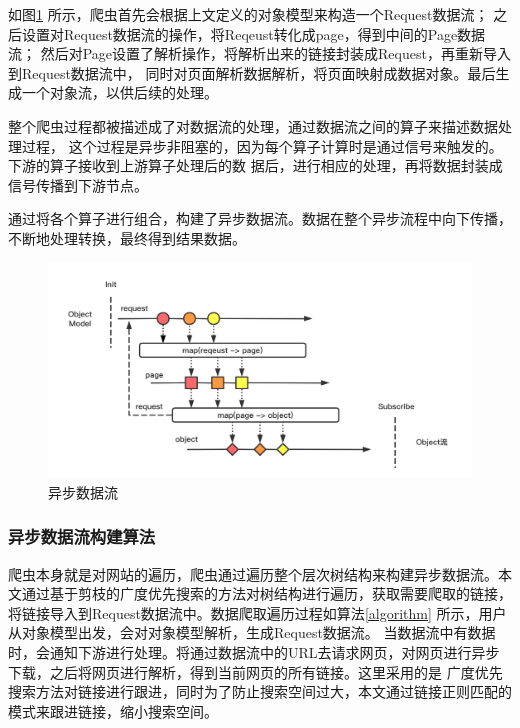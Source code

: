 \documentclass[master]{njuthesis}
\begin{document}
如图\ref{fig:model} 所示，爬虫首先会根据上文定义的对象模型来构造一个Request数据流；
之后设置对Request数据流的操作，将Reqeust转化成page，得到中间的Page数据流；
然后对Page设置了解析操作，将解析出来的链接封装成Request，再重新导入到Request数据流中，
同时对页面解析数据解析，将页面映射成数据对象。最后生成一个对象流，以供后续的处理。

整个爬虫过程都被描述成了对数据流的处理，通过数据流之间的算子来描述数据处理过程，
这个过程是异步非阻塞的，因为每个算子计算时是通过信号来触发的。下游的算子接收到上游算子处理后的数
据后，进行相应的处理，再将数据封装成信号传播到下游节点。

通过将各个算子进行组合，构建了异步数据流。数据在整个异步流程中向下传播，不断地处理转换，最终得到结果数据。

\begin{figure}[htbp]
\centering
\includegraphics[width= 1\textwidth]{pic/reactive-model.png}
\caption{异步数据流}\label{fig:model}
\end{figure}

\subsubsection{异步数据流构建算法}
爬虫本身就是对网站的遍历，爬虫通过遍历整个层次树结构来构建异步数据流。本文通过基于剪枝的广度优先搜索的方法对树结构进行遍历，获取需要爬取的链接，
将链接导入到Request数据流中。数据爬取遍历过程如算法\ref{algorithm} 所示，用户从对象模型出发，会对对象模型解析，生成Request数据流。
当数据流中有数据时，会通知下游进行处理。将通过数据流中的URL去请求网页，对网页进行异步下载，之后将网页进行解析，得到当前网页的所有链接。这里采用的是
广度优先搜索方法对链接进行跟进，同时为了防止搜索空间过大，本文通过链接正则匹配的模式来跟进链接，缩小搜索空间。
\end{document}
